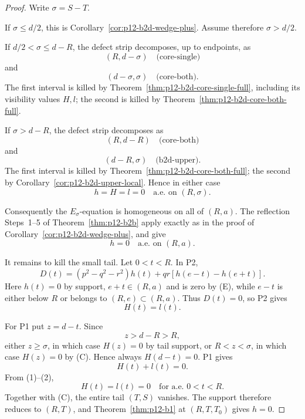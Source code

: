 \begin{proof}
Write \(\sigma=S-T\).

If \(\sigma\le d/2\), this is
Corollary~\ref{cor:p12-b2d-wedge-plus}.  Assume therefore
\(\sigma>d/2\).

If \(d/2<\sigma\le d-R\), the defect strip decomposes, up to endpoints,
as
\[
(R,d-\sigma)\quad\text{(core-single)}
\]
and
\[
(d-\sigma,\sigma)\quad\text{(core-both)}.
\]
The first interval is killed by
Theorem~\ref{thm:p12-b2d-core-single-full}, including its visibility
values \(H,l\); the second is killed by
Theorem~\ref{thm:p12-b2d-core-both-full}.

If \(\sigma>d-R\), the defect strip decomposes as
\[
(R,d-R)\quad\text{(core-both)}
\]
and
\[
(d-R,\sigma)\quad\text{(b2d-upper)}.
\]
The first interval is killed by
Theorem~\ref{thm:p12-b2d-core-both-full}; the second by
Corollary~\ref{cor:p12-b2d-upper-local}.  Hence in either case
\[
h=H=l=0
\quad\text{a.e. on }(R,\sigma).
\tag{C}
\]

Consequently the \(E_\sigma\)-equation is homogeneous on all of
\((R,a)\).  The reflection Steps~1--5 of
Theorem~\ref{thm:p12-b2b} apply exactly as in the proof of
Corollary~\ref{cor:p12-b2d-wedge-plus}, and give
\[
h=0
\quad\text{a.e. on }(R,a).
\tag{E}
\]

It remains to kill the small tail.  Let \(0<t<R\).
In P2,
\[
D(t)=(p^2-q^2-r^2)h(t)+qr[h(e-t)-h(e+t)].
\]
Here \(h(t)=0\) by support, \(e+t\in(R,a)\) and is zero by (E), while
\(e-t\) is either below \(R\) or belongs to \((R,e)\subset(R,a)\).
Thus \(D(t)=0\), so P2 gives
\[
H(t)=l(t).
\tag{1}
\]

For P1 put \(z=d-t\).  Since
\[
z>d-R>R,
\]
either \(z\ge\sigma\), in which case \(H(z)=0\) by tail support, or
\(R<z<\sigma\), in which case \(H(z)=0\) by (C).  Hence always
\(H(d-t)=0\).  P1 gives
\[
H(t)+l(t)=0.
\tag{2}
\]
From (1)--(2),
\[
H(t)=l(t)=0
\quad\text{for a.e. }0<t<R.
\]
Together with (C), the entire tail \((T,S)\) vanishes.  The support
therefore reduces to \((R,T)\), and
Theorem~\ref{thm:p12-b1} at \((R,T,T_0)\) gives \(h=0\).
\end{proof}
